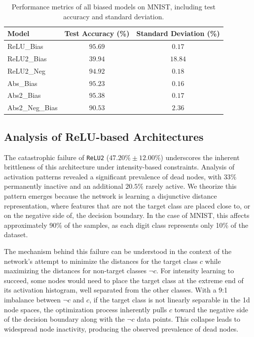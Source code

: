 \begin{table}[ht]
    \centering
    \begin{tabular}{lcc}
    \toprule
    \textbf{Model} & \textbf{Test Accuracy (\%)} & \textbf{Standard Deviation (\%)} \\
    \midrule
    ReLU\_Bias & $95.69$ & $0.17$ \\
    ReLU2\_Bias & $39.94$ & $18.84$ \\
    ReLU2\_Neg & $94.92$ & $0.18$ \\
    Abs\_Bias & $95.23$ & $0.16$ \\
    Abs2\_Bias & $95.38$ & $0.17$ \\
    Abs2\_Neg\_Bias & $90.53$ & $2.36$ \\
    \bottomrule
    \end{tabular}
    \caption{Performance metrics of all biased models on MNIST, including test accuracy and standard deviation.}
    \label{tab:biased_performance}
\end{table}

\subsection{Analysis of ReLU-based Architectures}

The catastrophic failure of \texttt{ReLU2} ($47.20\% \pm 12.00\%$) underscores the inherent brittleness of this architecture under intensity-based constraints. Analysis of activation patterns revealed a significant prevalence of dead nodes, with $33\%$ permanently inactive and an additional $20.5\%$ rarely active. We theorize this pattern emerges because the network is learning a disjunctive distance representation, where features that are not the target class are placed close to, or on the negative side of, the decision boundary. In the case of MNIST, this affects approximately 90\% of the samples, as each digit class represents only 10\% of the dataset.

The mechanism behind this failure can be understood in the context of the network's attempt to minimize the distances for the target class $c$ while maximizing the distances for non-target classes $\neg c$. For intensity learning to succeed, some nodes would need to place the target class at the extreme end of its activation histogram, well separated from the other classes. With a 9:1 imbalance between $\neg c$ and $c$, if the target class is not linearly separable in the 1d node spaces, the optimization process inherently pulls $c$ toward the negative side of the decision boundary along with the $\neg c$ data points. This collapse leads to widespread node inactivity, producing the observed prevalence of dead nodes.

